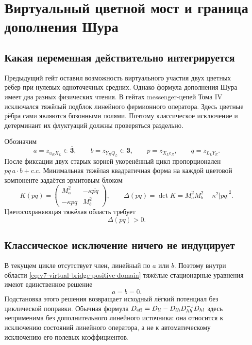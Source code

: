 \chapter{Виртуальный цветной мост и граница дополнения Шура}
\label{ch:v7-virtual-colored-bridge-schur-complement-gate}

\section{Какая переменная действительно интегрируется}

Предыдущий гейт оставил возможность виртуального участия двух цветных
рёбер при нулевых одноточечных средних. Однако формула дополнения Шура
имеет два разных физических чтения. В гейтах messenger-цепей Тома IV
исключался тяжёлый подблок линейного фермионного оператора. Здесь цветные
рёбра сами являются бозонными полями. Поэтому классическое исключение и
детерминант их флуктуаций должны проверяться раздельно.

Обозначим
\begin{equation}
 a=z_{u_RX_L}\in\overline{\mathbf3},\qquad
 b=z_{Y_RQ_L}\in\mathbf3,
 \qquad
 p=z_{X_Le_R},\qquad q=z_{L_LY_R}.
 \label{eq:v7-virtual-bridge-fields}
\end{equation}
После фиксации двух старых корней укоренённый цикл пропорционален
$pq\,a\cdot b+\mathrm{c.c.}$ Минимальная тяжёлая квадратичная форма на
каждой цветовой компоненте задаётся эрмитовым блоком
\begin{equation}
 K(pq)=
 \begin{pmatrix}
  M_a^2&-\kappa\overline{pq}\\
  -\kappa pq&M_b^2
 \end{pmatrix},
 \qquad
 \Delta(pq)=\det K=M_a^2M_b^2-\kappa^2|pq|^2.
 \label{eq:v7-virtual-bridge-heavy-block}
\end{equation}
Цветосохраняющая тяжёлая область требует
\begin{equation}
 \Delta(pq)>0.
 \label{eq:v7-virtual-bridge-positive-domain}
\end{equation}

\section{Классическое исключение ничего не индуцирует}

В текущем цикле отсутствует член, линейный по $a$ или $b$. Поэтому внутри
области \eqref{eq:v7-virtual-bridge-positive-domain} тяжёлые стационарные
уравнения имеют единственное решение
\begin{equation}
 a=b=0.
 \label{eq:v7-virtual-bridge-tree-solution}
\end{equation}
Подстановка этого решения возвращает исходный лёгкий потенциал без
циклической поправки. Обычная формула
$D_{\rm eff}=D_{ll}-D_{lh}D_{hh}^{-1}D_{hl}$ здесь неприменима без
дополнительного линейного источника: она относится к исключению состояний
линейного оператора, а не к автоматическому исключению его полевых
коэффициентов.

